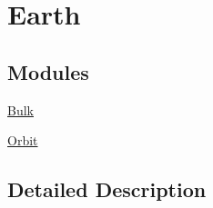 \hypertarget{group___e_g_x_phys-_constants-_astrophysics-_solar_system-_earth}{}\section{Earth}
\label{group___e_g_x_phys-_constants-_astrophysics-_solar_system-_earth}
\subsection*{Modules}
\begin{DoxyCompactItemize}
\item 
\mbox{\hyperlink{group___e_g_x_phys-_constants-_astrophysics-_solar_system-_earth-_bulk}{Bulk}}
\item 
\mbox{\hyperlink{group___e_g_x_phys-_constants-_astrophysics-_solar_system-_earth-_orbit}{Orbit}}
\end{DoxyCompactItemize}


\subsection{Detailed Description}
